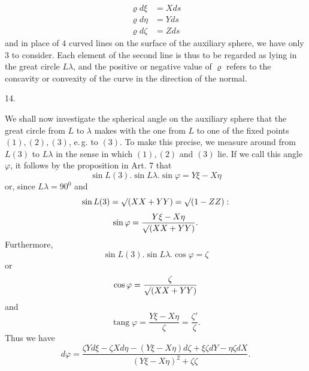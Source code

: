 %
\[
\begin{aligned}
\varrho d\xi&=Xds\\
\varrho d\eta&=Yds\\
\varrho d\zeta&=Zds
\end{aligned}
\]
and in place of $4$ curved lines on the surface of the auxiliary sphere, we have only $3$ to consider. Each element of the second line is thus to be regarded as lying in the great circle $L\lambda$, and the positive or negative value of $\varrho$ refers to the concavity or convexity of the curve in the direction of the normal.

\begin{center}14.\end{center}
\noindent\hspace*{1.2em}We shall now investigate the spherical angle on the auxiliary sphere that the great circle from $L$ to $\lambda$ makes with the one from $L$ to one of the fixed points $(1),(2),(3)$, e.\,g. to $(3)$. To make this precise, we measure around from $L(3)$ to $L\lambda$ in the sense in which $(1),(2)$ and $(3)$ lie. If we call this angle $\varphi$, it follows by the proposition in Art. $7$ that
\[
\sin L(3).\sin L\lambda.\sin\varphi=Y\xi-X\eta
\]
or, since $L\lambda=90^{0}$ and
\[
\sin L(3)=\mathord{\surd}(XX+YY)=\mathord{\surd}(1-ZZ):
\]
\[
\sin\varphi=\frac{Y\xi-X\eta}{\mathord{\surd}(XX+YY)}.
\]
Furthermore,
\[
\sin L(3).\sin L\lambda.\cos\varphi=\zeta
\]
or
\[
\cos\varphi=\frac{\zeta}{\mathord{\surd}(XX+YY)}
\]
and
\[
\operatorname{tang}\varphi=\frac{Y\xi-X\eta}{\zeta}=\frac{\zeta'}{\zeta}.
\]
Thus we have
\[
d\varphi=\frac{\zeta Yd\xi-\zeta Xd\eta-(Y\xi-X\eta)d\zeta+\xi\zeta dY-\eta\zeta dX}{(Y\xi-X\eta)^{2}+\zeta\zeta}.
\]
